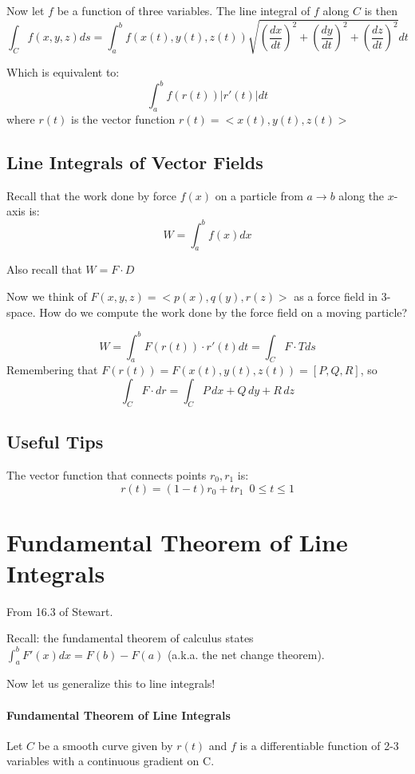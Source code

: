 \documentclass[a4paper,12pt]{report}
\begin{document}
Now let $f$ be a function of three variables. The line integral of $f$ along $C$ is then
$$\int_C f(x, y, z) ds = \int_a^b f(x(t), y(t), z(t))\sqrt{(\frac{dx}{dt})^2+(\frac{dy}{dt})^2+(\frac{dz}{dt})^2} dt$$

Which is equivalent to:
$$\int_a^b f(r(t)) |r'(t)| dt$$ where $r(t)$ is the vector function $r(t)=<x(t), y(t), z(t)>$

\subsection{Line Integrals of Vector Fields}
Recall that the work done by force $f(x)$ on a particle from $a \to b$ along the $x$-axis is: 
$$W = \int_a^b f(x) dx$$

Also recall that $W = F \cdot D$

Now we think of $F(x, y, z) = <p(x), q(y), r(z)>$ as a force field in 3-space. How do we compute the work done by 
the force field on a moving particle?

$$W = \int_a^b F(r(t)) \cdot r'(t) dt = \int_C F \cdot T ds$$
Remembering that $F(r(t)) = F(x(t), y(t), z(t)) = [P, Q, R]$, so 
$$\int_C F \cdot dr = \int_C P\,dx + Q\,dy + R\,dz$$






\subsection{Useful Tips}
The vector function that connects points $r_0, r_1$ is: 
$$r(t) = (1-t)r_0 + t r_1 \,\,\, 0 \leq t \leq 1$$





\section{Fundamental Theorem of Line Integrals}
From 16.3 of Stewart.

Recall: the fundamental theorem of calculus states $\int_a^b F'(x) dx = F(b) - F(a)$ (a.k.a. the net change theorem).

Now let us generalize this to line integrals! 

\paragraph{Fundamental Theorem of Line Integrals} Let $C$ be a smooth curve given by $r(t)$ and $f$ 
is a differentiable function of 2-3 variables with a continuous gradient on C. 
\end{document}

